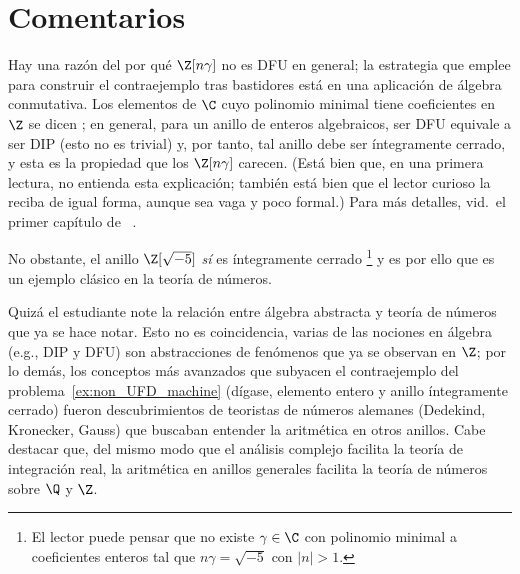 \documentclass[11pt, reqno]{amsart}
\begin{document}
\section*{Comentarios}

Hay una razón del por qué $\Z[n \gamma]$ no es DFU en general; la estrategia que emplee para construir el contraejemplo tras bastidores está
en una aplicación de álgebra conmutativa.
Los elementos de $\C$ cuyo polinomio minimal tiene coeficientes en $\Z$ se dicen ;
en general, para un anillo de enteros algebraicos, ser DFU equivale a ser DIP (esto no es trivial) y, por tanto, tal anillo debe ser
íntegramente cerrado, y esta es la propiedad que los $\Z[n \gamma]$ carecen.
(Está bien que, en una primera lectura, no entienda esta explicación; también está bien que el lector curioso la reciba de igual forma,
aunque sea vaga y poco formal.)
Para más detalles, vid.\ el primer capítulo de \citeauthor{janusz:algebraic}~\cite{janusz:algebraic}.

No obstante, el anillo $\Z[\sqrt{-5}]$ \emph{sí} es íntegramente cerrado%
\footnote{El lector puede pensar que no existe $\gamma \in \C$ con polinomio minimal a coeficientes enteros tal que $n \gamma = \sqrt{-5}$
con $|n| > 1$.}
y es por ello que es un ejemplo clásico en la teoría de números.

Quizá el estudiante note la relación entre álgebra abstracta y teoría de números que ya se hace notar.
Esto no es coincidencia, varias de las nociones en álgebra (e.g., DIP y DFU) son abstracciones de fenómenos que ya se observan en $\Z$;
por lo demás, los conceptos más avanzados que subyacen el contraejemplo del problema~\ref{ex:non_UFD_machine} (dígase, elemento entero y
anillo íntegramente cerrado) fueron descubrimientos de teoristas de números alemanes (Dedekind, Kronecker, Gauss) que buscaban entender la
aritmética en otros anillos.
Cabe destacar que, del mismo modo que el análisis complejo facilita la teoría de integración real, la aritmética en anillos generales
facilita la teoría de números sobre $\Q$ y $\Z$.

\nocite{burton:elementary, andreescu:problems}
\printbibliography[title={Referencias y lecturas adicionales}]
\end{document}
